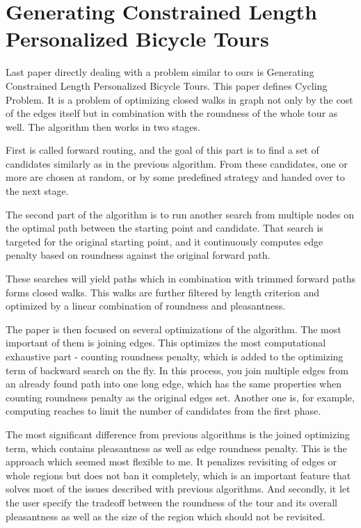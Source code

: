\documentclass{ctuthesis}
\begin{document}
\section{Generating Constrained Length Personalized Bicycle Tours}
Last paper directly dealing with a problem similar to ours is Generating Constrained Length Personalized Bicycle Tours.\cite{stroobant} This paper defines Cycling Problem. It is a problem of optimizing closed walks in graph not only by the cost of the edges itself but in combination with the roundness of the whole tour as well. The algorithm then works in two stages. \par 
First is called forward routing, and the goal of this part is to find a set of candidates similarly as in the previous algorithm. From these candidates, one or more are chosen at random, or by some predefined strategy and handed over to the next stage. \par 
The second part of the algorithm is to run another search from multiple nodes on the optimal path between the starting point and candidate. That search is targeted for the original starting point, and it continuously computes edge penalty based on roundness against the original forward path. \par
These searches will yield paths which in combination with trimmed forward paths forms closed walks. This walks are further filtered by length criterion and optimized by a linear combination of roundness and pleasantness. \par
The paper is then focused on several optimizations of the algorithm. The most important of them is joining edges. This optimizes the most computational exhaustive part - counting roundness penalty, which is added to the optimizing term of backward search on the fly. In this process, you join multiple edges from an already found path into one long edge, which has the same properties when counting roundness penalty as the original edges set. Another one is, for example, computing reaches to limit the number of candidates from the first phase. \par 
The most significant difference from previous algorithms is the joined optimizing term, which contains pleasantness as well as edge roundness penalty. This is the approach which seemed most flexible to me. It penalizes revisiting of edges or whole regions but does not ban it completely, which is an important feature that solves most of the issues described with previous algorithms. And secondly, it let the user specify the tradeoff between the roundness of the tour and its overall pleasantness as well as the size of the region which should not be revisited. \par 
\end{document}
